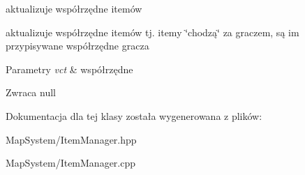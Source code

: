 aktualizuje współrzędne itemów 

aktualizuje współrzędne itemów tj. itemy \char`\"{}chodzą\char`\"{} za graczem, są im przypisywane współrzędne gracza 
\begin{DoxyParams}{Parametry}
{\em vct} & współrzędne \\
\hline
\end{DoxyParams}
\begin{DoxyReturn}{Zwraca}
null 
\end{DoxyReturn}


Dokumentacja dla tej klasy została wygenerowana z plików\-:\begin{DoxyCompactItemize}
\item 
Map\-System/Item\-Manager.\-hpp\item 
Map\-System/Item\-Manager.\-cpp\end{DoxyCompactItemize}
